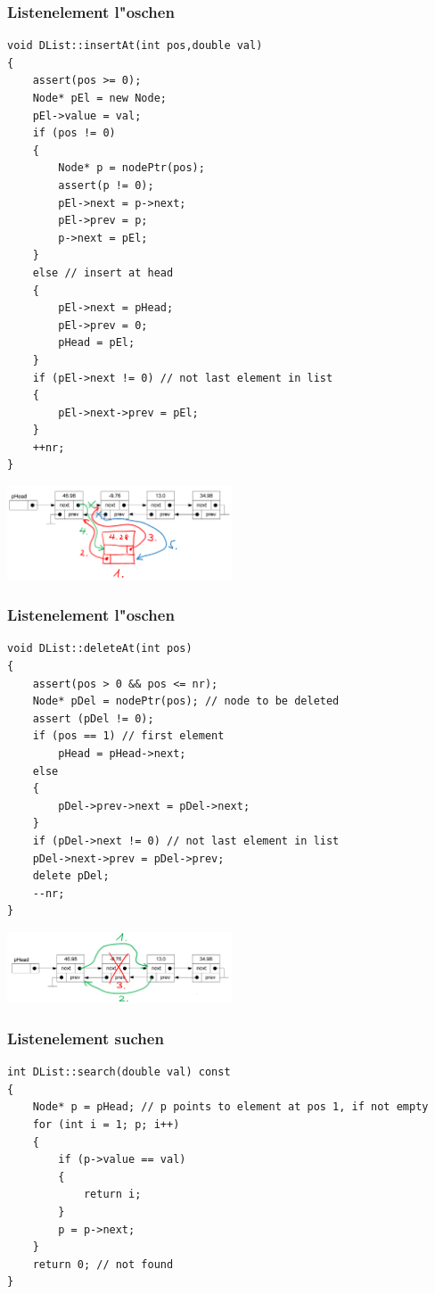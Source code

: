 \subsubsection{Listenelement l"oschen}
\begin{lstlisting}[style=C]
void DList::insertAt(int pos,double val)
{
	assert(pos >= 0);
	Node* pEl = new Node;
	pEl->value = val;
	if (pos != 0)
	{
		Node* p = nodePtr(pos);
		assert(p != 0);
		pEl->next = p->next;
		pEl->prev = p;
		p->next = pEl;
	}
	else // insert at head
	{
		pEl->next = pHead;
		pEl->prev = 0;
		pHead = pEl;
	}
	if (pEl->next != 0) // not last element in list
	{
		pEl->next->prev = pEl;
	}
	++nr;
}
\end{lstlisting}
\begin{flushleft}
{\includegraphics[width=0.5\textwidth]{images/Listen/DLL_Insert.png}}
\label{Fig: Element bei DLL einf"ugen}
\end{flushleft}

\subsubsection{Listenelement l"oschen}
\begin{lstlisting}[style=C]
void DList::deleteAt(int pos)
{
	assert(pos > 0 && pos <= nr);
	Node* pDel = nodePtr(pos); // node to be deleted
	assert (pDel != 0);
	if (pos == 1) // first element
		pHead = pHead->next;
	else
	{
		pDel->prev->next = pDel->next;
	}
	if (pDel->next != 0) // not last element in list
	pDel->next->prev = pDel->prev;
	delete pDel;
	--nr;
}
\end{lstlisting}
\begin{flushleft}
{\includegraphics[width=0.5\textwidth]{images/Listen/DLL_Delete.png}}
\label{Fig: Element bei DLL l"oschen}
\end{flushleft}

\subsubsection{Listenelement suchen}
\begin{lstlisting}[style=C]
int DList::search(double val) const
{
	Node* p = pHead; // p points to element at pos 1, if not empty
	for (int i = 1; p; i++)
	{
		if (p->value == val)
		{
			return i;
		}
		p = p->next;
	}
	return 0; // not found
}
\end{lstlisting}
